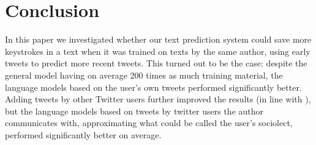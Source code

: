 \documentclass[11pt]{article}
\begin{document}
\section{Conclusion}
In this paper we investigated whether our text prediction system could save more keystrokes in a text when it was trained on texts by the same author, using early tweets to predict more recent tweets. This turned out to be the case: despite the general model having on average 200 times as much training material, the language models based on the user's own tweets performed significantly better. Adding tweets by other Twitter users further improved the results (in line with \cite{verberne12}), but the language models based on tweets by twitter users the author communicates with, approximating what could be called the user's sociolect, performed significantly better on average.



\end{document}
